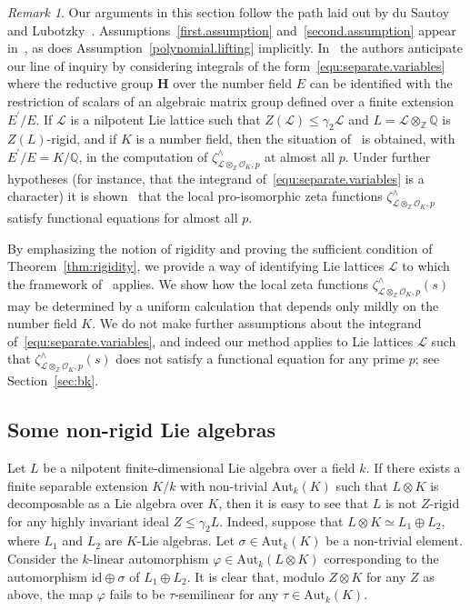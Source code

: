 \documentclass[11pt,a4paper]{amsart}
\theoremstyle{plain}
\theoremstyle{remark}
\newtheorem{rem}[thm]{Remark}
\newcommand{\Z}{\mathbb{Z}}
\newcommand{\Q}{\mathbb{Q}}
\newcommand{\tensor}{\otimes}
\begin{document}
\begin{rem} \label{rem:duSL}
Our arguments in this section follow the path laid out by du Sautoy and Lubotzky~\cite{duSLubotzky/96}.  Assumptions~\ref{first.assumption} and~\ref{second.assumption} appear in~\cite{duSLubotzky/96}, as does Assumption~\ref{polynomial.lifting} implicitly.  
In~\cite[\S6]{duSLubotzky/96} the authors anticipate our line of inquiry by considering integrals of the form~\eqref{equ:separate.variables} where the reductive group $\mathbf{H}$ over the number field $E$ can be identified with the restriction of scalars of an algebraic matrix group defined over a finite extension $E^\prime / E$.  If $\mathcal{L}$ is a nilpotent Lie lattice such that $Z(\mathcal{L}) \leq \gamma_2 \mathcal{L}$ and $L = \mathcal{L} \tensor_\Z \Q$ is $Z(L)$-rigid, and if $K$ is a number field, then the situation of~\cite[\S6]{duSLubotzky/96} is obtained, with $E^\prime / E = K / \Q$, in the computation of $\zeta^\wedge_{\mathcal{L} \tensor_\Z \mathcal{O}_K, p}$ at almost all $p$.  Under further hypotheses (for instance, that the integrand of~\eqref{equ:separate.variables} is a character) it is shown~\cite[Theorem~6.9]{duSLubotzky/96} that the local pro-isomorphic zeta functions $\zeta^\wedge_{\mathcal{L} \tensor_\Z \mathcal{O}_K, p}$ satisfy functional equations for almost all $p$.  

By emphasizing the notion of rigidity and proving the sufficient condition of Theorem~\ref{thm:rigidity}, we provide a way of identifying Lie lattices $\mathcal{L}$ to which the framework of~\cite[\S6]{duSLubotzky/96} applies.  We show how the local zeta functions $\zeta^\wedge_{\mathcal{L} \tensor_\Z \mathcal{O}_K, p}(s)$ may be determined by a uniform calculation that depends only mildly on the number field $K$.  We do not make further assumptions about the integrand of~\eqref{equ:separate.variables}, and indeed our method applies to Lie lattices $\mathcal{L}$ such that $\zeta^\wedge_{\mathcal{L} \tensor_\Z \mathcal{O}_K, p}(s)$ does not satisfy a functional equation for any prime $p$; see Section~\ref{sec:bk}.
\end{rem}

\subsection{Some non-rigid Lie algebras} \label{sec:non-rigid}
Let $L$ be a nilpotent finite-dimensional Lie algebra over a field $k$.  If there exists a finite separable extension $K/k$ with non-trivial $\mathrm{Aut}_k(K)$ such that $L \tensor K$ is decomposable as a Lie algebra over $K$, then it is easy to see that $L$ is not $Z$-rigid for any highly invariant ideal $Z \leq \gamma_2 L$.  Indeed, suppose that $L \tensor K \simeq L_1 \oplus L_2$, where $L_1$ and $L_2$ are $K$-Lie algebras.  Let $\sigma \in \mathrm{Aut}_k(K)$ be a non-trivial element.  Consider the $k$-linear automorphism $\varphi \in \mathrm{Aut}_k(L \tensor K)$ corresponding to the automorphism $\mathrm{id} \oplus \sigma$ of $L_1 \oplus L_2$.  It is clear that, modulo $Z \tensor K$ for any $Z$ as above, the map $\varphi$ fails to be $\tau$-semilinear for any $\tau \in \mathrm{Aut}_k(K)$.  
\end{document}

